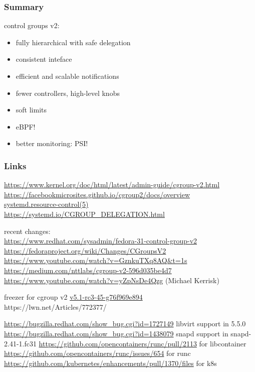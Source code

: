 \documentclass[serif]{beamer}
\begin{document}
\begin{frame}
  \frametitle{Summary}

  control groups v2:
  \begin{itemize}
  \item fully hierarchical with safe delegation
  \item consistent inteface
  \item efficient and scalable notifications
  \item fewer controllers, high-level knobs
  \item soft limits
  \item eBPF!
  \item better monitoring: PSI!
  \end{itemize}
\end{frame}

\begin{frame}[fragile]
  \frametitle{Links}
  \tiny

  \url{https://www.kernel.org/doc/html/latest/admin-guide/cgroup-v2.html}\\
  \url{https://facebookmicrosites.github.io/cgroup2/docs/overview}\\
  \href{https://www.freedesktop.org/software/systemd/man/systemd.resource-control.html}{systemd.resource-control(5)}\\
  \url{https://systemd.io/CGROUP_DELEGATION.html}
  
  recent changes: \\
  \url{https://www.redhat.com/sysadmin/fedora-31-control-group-v2}\\
  \url{https://fedoraproject.org/wiki/Changes/CGroupsV2}\\
  \url{https://www.youtube.com/watch?v=GznkuTXq8AQ&t=1s}\\
  \url{https://medium.com/nttlabs/cgroup-v2-596d035be4d7}\\
  \url{https://www.youtube.com/watch?v=yZpNsDe4Qzg} (Michael Kerrisk)

  freezer for cgroup v2 \href{https://git.kernel.org/pub/scm/linux/kernel/git/torvalds/linux.git/commit/v5.1-rc3-45-g76f969e894}{v5.1-rc3-45-g76f969e894}\\
  https://lwn.net/Articles/772377/

  \url{https://bugzilla.redhat.com/show_bug.cgi?id=1727149} libvirt support in 5.5.0
  \url{https://bugzilla.redhat.com/show_bug.cgi?id=1438079} snapd support in snapd-2.41-1.fc31
  \url{https://github.com/opencontainers/runc/pull/2113} for libcontainer
  \url{https://github.com/opencontainers/runc/issues/654} for runc
  \url{https://github.com/kubernetes/enhancements/pull/1370/files} for k8s


\end{frame}
\end{document}
